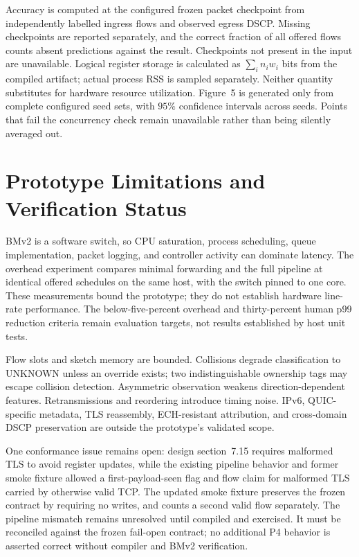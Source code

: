 Accuracy is computed at the configured frozen packet checkpoint from independently
labelled ingress flows and observed egress DSCP. Missing checkpoints are reported
separately, and the correct fraction of all offered flows counts absent predictions
against the result. Checkpoints not present in the input are unavailable. Logical
register storage is calculated as $\sum_i n_i w_i$ bits from the compiled artifact;
actual process RSS is sampled separately. Neither quantity substitutes for hardware
resource utilization. Figure~5 is generated only from complete configured seed sets,
with $95\%$ confidence intervals across seeds. Points that fail the concurrency check
remain unavailable rather than being silently averaged out.

\section{Prototype Limitations and Verification Status}
\label{sec:dataplane-limitations}

BMv2 is a software switch, so CPU saturation, process scheduling, queue implementation,
packet logging, and controller activity can dominate latency. The overhead experiment
compares minimal forwarding and the full pipeline at identical offered schedules on the
same host, with the switch pinned to one core. These measurements bound the prototype;
they do not establish hardware line-rate performance. The below-five-percent overhead
and thirty-percent human p99 reduction criteria remain evaluation targets, not results
established by host unit tests.

Flow slots and sketch memory are bounded. Collisions degrade classification to UNKNOWN
unless an override exists; two indistinguishable ownership tags may escape collision
detection. Asymmetric observation weakens direction-dependent features. Retransmissions
and reordering introduce timing noise. IPv6, QUIC-specific metadata, TLS reassembly,
ECH-resistant attribution, and cross-domain DSCP preservation are outside the prototype's
validated scope.

One conformance issue remains open: design section~7.15 requires malformed TLS to avoid
register updates, while the existing pipeline behavior and former smoke fixture allowed a first-payload-seen
flag and flow claim for malformed TLS carried by otherwise valid TCP. The updated smoke
fixture preserves the frozen contract by requiring no writes, and counts a second valid
flow separately. The pipeline mismatch remains unresolved until compiled and exercised. It must be reconciled against the frozen fail-open contract;
no additional P4 behavior is asserted correct without compiler and BMv2 verification.


